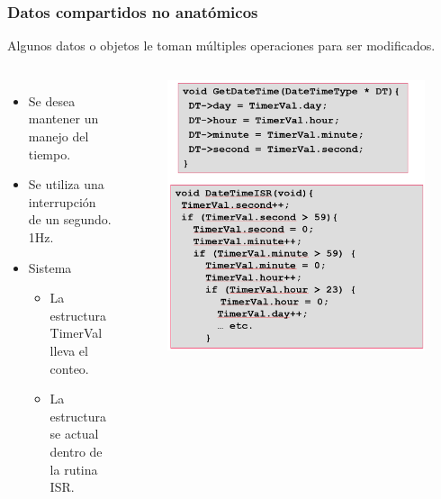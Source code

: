 \documentclass[10.5pt,scale=1.0,t,aspectratio=169,hyperref={pdfpagelabels=false}]{beamer}
\begin{document}
\begin{frame}
	\frametitle{Datos compartidos no anatómicos}
	Algunos datos o objetos le toman múltiples operaciones para ser modificados. 
	\begin{columns}
		\begin{itemize}
			\item Se desea mantener un manejo del tiempo.
			\item Se utiliza una interrupción de un segundo. 1Hz.
			\item Sistema
			\begin{itemize}
				\item La estructura TimerVal lleva el conteo.
				\item La estructura se actual dentro de la rutina ISR.
			\end{itemize}
		\end{itemize}
	
		\begin{figure}
			\centering
			\includegraphics[scale=0.3]{08_Atomic}
		\end{figure}
	\end{columns}
\end{frame}
\end{document}
